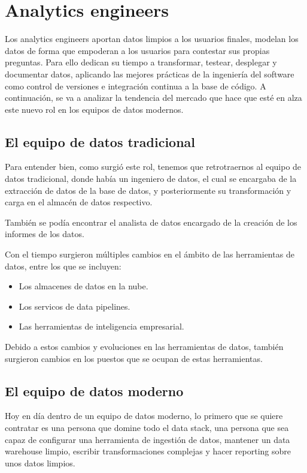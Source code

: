 \section{Analytics engineers}
Los analytics engineers\cite{Analytics_engineering} aportan datos limpios a los usuarios finales, modelan los datos de forma que empoderan a los usuarios para contestar sus propias preguntas. Para ello dedican su tiempo a transformar, testear, desplegar y documentar datos, aplicando las mejores prácticas de la ingeniería del software como control de versiones e integración continua a la base de código. A continuación, se va a analizar la tendencia del mercado que hace que esté en alza este nuevo rol en los equipos de datos modernos.

\subsection{El equipo de datos tradicional}

Para entender bien, como surgió este rol, tenemos que retrotraernos al equipo de datos tradicional, donde había un ingeniero de datos, el cual se encargaba de la extracción de datos de la base de datos, y posteriormente su transformación y carga en el almacén de datos respectivo. 

También se podía encontrar el analista de datos encargado de la creación de los informes de los datos.

Con el tiempo surgieron múltiples cambios en el ámbito de las herramientas de datos, entre los que se incluyen:

\begin{itemize}
	\item Los almacenes de datos en la nube.
	\item Los servicos de data pipelines.
	\item Las herramientas de inteligencia empresarial.
\end{itemize}

Debido a estos cambios y evoluciones en las herramientas de datos, también surgieron cambios en los puestos que se ocupan de estas herramientas.

\subsection{El equipo de datos moderno}

Hoy en día dentro de un equipo de datos moderno, lo primero que se quiere contratar es una persona que domine todo el data stack, una persona que sea capaz de configurar una herramienta de ingestión de datos, mantener un data warehouse limpio, escribir transformaciones complejas y hacer reporting sobre unos datos limpios. 

